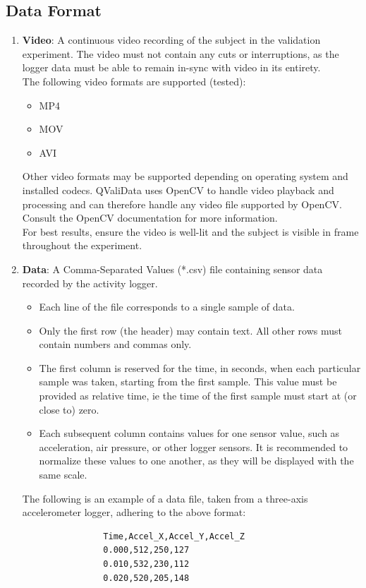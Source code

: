 \documentclass[]{article}
\begin{document}
	\subsection{Data Format}
		\begin{enumerate}
			\item \textbf{Video}: A continuous video recording of the subject in the validation experiment. The video must not contain any cuts or interruptions, as the logger data must be able to remain in-sync with video in its entirety.\\
			The following video formats are supported (tested):
			\begin{itemize}
				\item MP4
				\item MOV
				\item AVI
			\end{itemize}
			Other video formats may be supported depending on operating system and installed codecs. QValiData uses OpenCV to handle video playback and processing and can therefore handle any video file supported by OpenCV. Consult the OpenCV documentation for more information.\\
			
			For best results, ensure the video is well-lit and the subject is visible in frame throughout the experiment.
			
			\item \textbf{Data}: A Comma-Separated Values (*.csv) file containing sensor data recorded by the activity logger.
				\begin{itemize}
					\item Each line of the file corresponds to a single sample of data. 
					\item Only the first row (the header) may contain text. All other rows must contain numbers and commas only.
					\item The first column is reserved for the time, in seconds, when each particular sample was taken, starting from the first sample. This value must be provided as relative time, ie the time of the first sample must start at (or close to) zero. 
					\item Each subsequent column contains values for one sensor value, such as acceleration, air pressure, or other logger sensors. It is recommended to normalize these values to one another, as they will be displayed with the same scale.
				\end{itemize} 
				The following is an example of a data file, taken from a three-axis accelerometer logger, adhering to the above format:
				\begin{verbatim}
				Time,Accel_X,Accel_Y,Accel_Z
				0.000,512,250,127
				0.010,532,230,112
				0.020,520,205,148
				\end{verbatim}
			

\end{enumerate}
\end{document}
